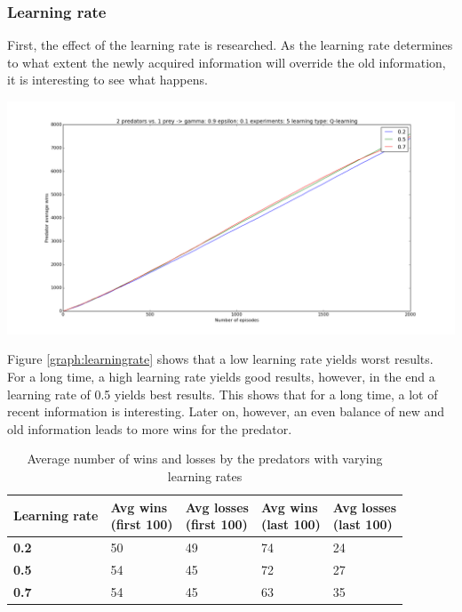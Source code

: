 \subsubsection{Learning rate}
First, the effect of the learning rate is researched. As the learning rate determines to what extent the newly acquired information will override the old information, it is interesting to see what happens.

\begin{center}
	\includegraphics[scale=0.3]{2_predators_learning_rate_q_learning}
	\label{graph:learningrate}
\end{center}

Figure \ref{graph:learningrate} shows that a low learning rate yields worst results. For a long time, a high learning rate yields good results, however, in the end a learning rate of 0.5 yields best results. This shows that for a long time, a lot of recent information is interesting.  Later on, however, an even balance of new and old information leads to more wins for the predator. 

\begin{table}[H]
\begin{center}
\begin{tabular}{| l | l | l | l | l |}
\hline
\parbox{2cm}{\textbf{Learning rate}} & \parbox{2cm}{\textbf{Avg wins \\ (first 100)}} & \parbox{2cm}{\textbf{Avg losses \\ (first 100)}} & \parbox{2cm}{\textbf{Avg wins \\ (last 100)}} & \parbox{2cm}{\textbf{Avg losses \\ (last 100)}} \\
\hline
\textbf{0.2} & 50 & 49 & 74 & 24 \\
\hline
\textbf{0.5} & 54 & 45 & 72 & 27 \\
\hline
\textbf{0.7} & 54 & 45 & 63 & 35 \\
\hline
\end{tabular}
\caption{Average number of wins and losses by the predators with varying learning rates}
\label{table:learningrate}
\end{center}
\end{table}

